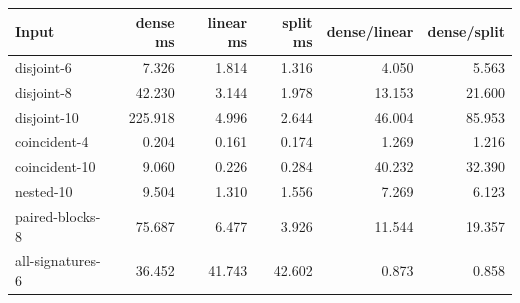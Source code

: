 \begin{center}\small
\begin{tabular}{@{}lrrrrr@{}}
\toprule
Input & dense ms & linear ms & split ms & dense/linear & dense/split \\
\midrule
disjoint-6 & 7.326 & 1.814 & 1.316 & 4.050 & 5.563 \\
disjoint-8 & 42.230 & 3.144 & 1.978 & 13.153 & 21.600 \\
disjoint-10 & 225.918 & 4.996 & 2.644 & 46.004 & 85.953 \\
coincident-4 & 0.204 & 0.161 & 0.174 & 1.269 & 1.216 \\
coincident-10 & 9.060 & 0.226 & 0.284 & 40.232 & 32.390 \\
nested-10 & 9.504 & 1.310 & 1.556 & 7.269 & 6.123 \\
paired-blocks-8 & 75.687 & 6.477 & 3.926 & 11.544 & 19.357 \\
all-signatures-6 & 36.452 & 41.743 & 42.602 & 0.873 & 0.858 \\
\bottomrule
\end{tabular}
\end{center}
